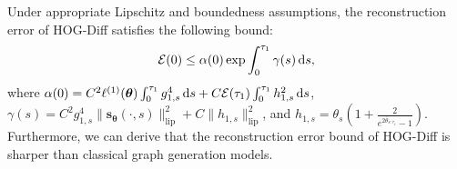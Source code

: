 Under appropriate Lipschitz and boundedness assumptions, the reconstruction error of HOG-Diff satisfies the following bound: 
\begin{equation}
\mathcal{E}(0)
\leq 
\alpha(0)\exp{\int_0^{\tau_1} \gamma(s) } \mathop{}\!\mathrm{d}{s},
\end{equation}
where $\alpha(0)=C^2 \ell^{(1)} (\bm{\theta}) \int_0^{\tau_1} g_{1,s}^4 \mathop{}\!\mathrm{d}{s}
+ C \mathcal{E}(\tau_1) \int_0^{\tau_1} h_{1,s}^2 \mathop{}\!\mathrm{d}{s}$, 
$\gamma(s) = C^2 g_{1,s}^4 \|\bm{s}_{\bm{\theta}}(\cdot,s)\|_{\mathrm{lip}}^2 
 + C \|h_{1,s}\|_{\mathrm{lip}}^2$,
and $h_{1,s} = \theta_s \left(1 + \frac{2}{e^{2\bar{\theta}_{s:\tau_1}}-1}\right)$.
%
Furthermore, we can derive that the reconstruction error bound of HOG-Diff is sharper than classical graph generation models.